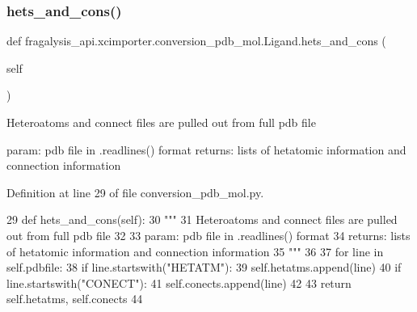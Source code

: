 \subsubsection{\texorpdfstring{hets\+\_\+and\+\_\+cons()}{hets\_and\_cons()}}
{\footnotesize\ttfamily def fragalysis\+\_\+api.\+xcimporter.\+conversion\+\_\+pdb\+\_\+mol.\+Ligand.\+hets\+\_\+and\+\_\+cons (\begin{DoxyParamCaption}\item[{}]{self }\end{DoxyParamCaption})}

\begin{DoxyVerb}Heteroatoms and connect files are pulled out from full pdb file

param: pdb file in .readlines() format
returns: lists of hetatomic information and connection information
\end{DoxyVerb}
 

Definition at line 29 of file conversion\+\_\+pdb\+\_\+mol.\+py.


\begin{DoxyCode}
29     \textcolor{keyword}{def }hets\_and\_cons(self):
30         \textcolor{stringliteral}{"""}
31 \textcolor{stringliteral}{        Heteroatoms and connect files are pulled out from full pdb file}
32 \textcolor{stringliteral}{}
33 \textcolor{stringliteral}{        param: pdb file in .readlines() format}
34 \textcolor{stringliteral}{        returns: lists of hetatomic information and connection information}
35 \textcolor{stringliteral}{        """}
36 
37         \textcolor{keywordflow}{for} line \textcolor{keywordflow}{in} self.pdbfile:
38             \textcolor{keywordflow}{if} line.startswith(\textcolor{stringliteral}{"HETATM"}):
39                 self.hetatms.append(line)
40             \textcolor{keywordflow}{if} line.startswith(\textcolor{stringliteral}{"CONECT"}):
41                 self.conects.append(line)
42 
43         \textcolor{keywordflow}{return} self.hetatms, self.conects
44 
\end{DoxyCode}
\mbox{\label{classfragalysis__api_1_1xcimporter_1_1conversion__pdb__mol_1_1_ligand_af21865a4bb9be6aab21bfc82668ba25e}} 
